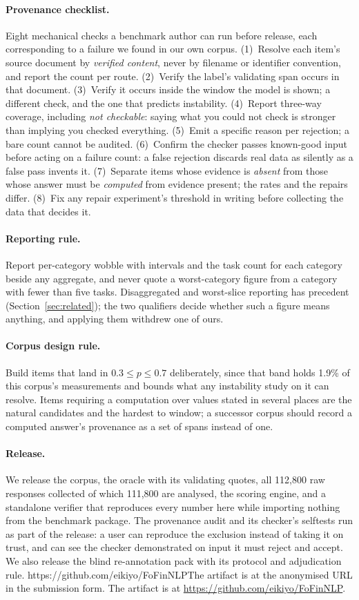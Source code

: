 \documentclass[11pt]{article}
\makeatletter
\newcommand{\artifacturl}{https://github.com/eikiyo/FoFinNLP}
\newcommand{\artifactpointer}{%
  \ifx\artifacturl\@empty The artifact is at the anonymised URL in the submission form.%
  \else The artifact is at \url{\artifacturl}.\fi}
\makeatother
\begin{document}
\paragraph{Provenance checklist.} Eight mechanical checks a benchmark author can run before
release, each corresponding to a failure we found in our own corpus.
(1)~Resolve each item's source document by \emph{verified content}, never by filename or identifier
convention, and report the count per route.
(2)~Verify the label's validating span occurs in that document.
(3)~Verify it occurs inside the window the model is shown; a different check, and the one that
predicts instability.
(4)~Report three-way coverage, including \emph{not checkable}: saying what you could not check is
stronger than implying you checked everything.
(5)~Emit a specific reason per rejection; a bare count cannot be audited.
(6)~Confirm the checker passes known-good input before acting on a failure count: a false
rejection discards real data as silently as a false pass invents it.
(7)~Separate items whose evidence is \emph{absent} from those whose answer must be \emph{computed}
from evidence present; the rates and the repairs differ.
(8)~Fix any repair experiment's threshold in writing before collecting the data that decides it.

\paragraph{Reporting rule.} Report per-category wobble with intervals and the task count for each
category beside any aggregate, and never quote a worst-category figure from a category with fewer
than five tasks. Disaggregated and worst-slice reporting has precedent (Section~\ref{sec:related});
the two qualifiers decide whether such a figure means anything, and applying them withdrew one of
ours.

\paragraph{Corpus design rule.} Build items that land in $0.3 \le p \le 0.7$ deliberately, since
that band holds 1.9\% of this corpus's measurements and bounds what any instability study on it
can resolve. Items requiring a computation over values stated in several places are the natural
candidates and the hardest to window; a successor corpus should record a computed answer's
provenance as a set of spans instead of one.

\paragraph{Release.} We release the corpus, the oracle with its validating quotes, all 112{,}800
raw responses collected of which 111{,}800 are analysed, the scoring engine, and a standalone
verifier that reproduces every number here while importing nothing from the benchmark
package. The provenance audit and its checker's selftests run as part of the release: a user
can reproduce the exclusion instead of taking it on trust, and can see the checker demonstrated on
input it must reject and accept. We also release the blind re-annotation pack with
its protocol and adjudication rule. \artifactpointer
\end{document}
